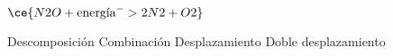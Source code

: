 $\ce{N2O + \text{energía} ^ -> 2N2 + O2}$

\begin{choices}
    \CorrectChoice Descomposición
    \choice Combinación
    \choice Desplazamiento
    \choice Doble desplazamiento
\end{choices}